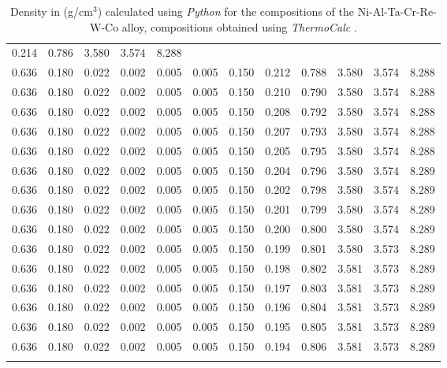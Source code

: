 \begin{longtable}{rrrrrrrrrrrr}
0.214 & 0.786 & 3.580 & 3.574 & 8.288 \\0.636 & 0.180 & 0.022 & 0.002 & 0.005 & 0.005 & 0.150 & 0.212 & 0.788 & 3.580 & 3.574 & 8.288 \\0.636 & 0.180 & 0.022 & 0.002 & 0.005 & 0.005 & 0.150 & 0.210 & 0.790 & 3.580 & 3.574 & 8.288 \\0.636 & 0.180 & 0.022 & 0.002 & 0.005 & 0.005 & 0.150 & 0.208 & 0.792 & 3.580 & 3.574 & 8.288 \\0.636 & 0.180 & 0.022 & 0.002 & 0.005 & 0.005 & 0.150 & 0.207 & 0.793 & 3.580 & 3.574 & 8.288 \\0.636 & 0.180 & 0.022 & 0.002 & 0.005 & 0.005 & 0.150 & 0.205 & 0.795 & 3.580 & 3.574 & 8.288 \\0.636 & 0.180 & 0.022 & 0.002 & 0.005 & 0.005 & 0.150 & 0.204 & 0.796 & 3.580 & 3.574 & 8.289 \\0.636 & 0.180 & 0.022 & 0.002 & 0.005 & 0.005 & 0.150 & 0.202 & 0.798 & 3.580 & 3.574 & 8.289 \\0.636 & 0.180 & 0.022 & 0.002 & 0.005 & 0.005 & 0.150 & 0.201 & 0.799 & 3.580 & 3.574 & 8.289 \\0.636 & 0.180 & 0.022 & 0.002 & 0.005 & 0.005 & 0.150 & 0.200 & 0.800 & 3.580 & 3.574 & 8.289 \\0.636 & 0.180 & 0.022 & 0.002 & 0.005 & 0.005 & 0.150 & 0.199 & 0.801 & 3.580 & 3.573 & 8.289 \\0.636 & 0.180 & 0.022 & 0.002 & 0.005 & 0.005 & 0.150 & 0.198 & 0.802 & 3.581 & 3.573 & 8.289 \\0.636 & 0.180 & 0.022 & 0.002 & 0.005 & 0.005 & 0.150 & 0.197 & 0.803 & 3.581 & 3.573 & 8.289 \\0.636 & 0.180 & 0.022 & 0.002 & 0.005 & 0.005 & 0.150 & 0.196 & 0.804 & 3.581 & 3.573 & 8.289 \\0.636 & 0.180 & 0.022 & 0.002 & 0.005 & 0.005 & 0.150 & 0.195 & 0.805 & 3.581 & 3.573 & 8.289 \\0.636 & 0.180 & 0.022 & 0.002 & 0.005 & 0.005 & 0.150 & 0.194 & 0.806 & 3.581 & 3.573 & 8.289 \\
    \caption{Density in (g/cm$^3$) calculated using \textit{Python} \citep{mygit} for the compositions of the Ni-Al-Ta-Cr-Re-W-Co alloy, compositions obtained using \textit{ThermoCalc}  \citep{thermocalc}.}
    \label{tab:tab12}
\end{longtable}